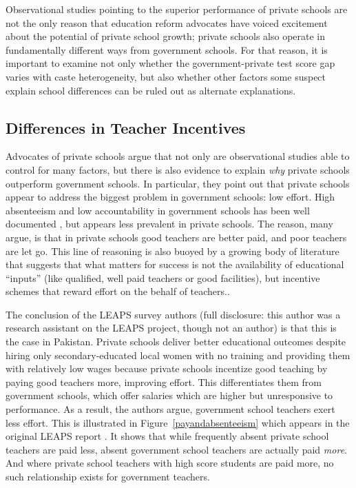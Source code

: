 \documentclass[Eubank_pk_ethnic_sorting.tex]{subfiles}
\begin{document}
Observational studies pointing to the superior performance of private schools are not the only reason that education reform advocates have voiced excitement about the potential of private school growth; private schools also operate in fundamentally different ways from government schools. For that reason, it is important to examine not only whether the government-private test score gap varies with caste heterogeneity, but also whether other factors some suspect explain school differences can be ruled out as alternate explanations. 


\subsection{Differences in Teacher Incentives}\label{}

Advocates of private schools argue that not only are observational studies able to control for many factors, but there is also evidence to explain \emph{why} private schools outperform government schools. In particular, they point out that private schools appear to address the biggest problem in government schools: low effort. High absenteeism and low accountability in government schools has been well documented \citep{Muralidharan:2008tb, Chaudhury:2006vp}, but appears less prevalent in private schools. The reason, many argue, is that in private schools good teachers are better paid, and poor teachers are let go. This line of reasoning is also buoyed by a growing body of literature that suggests that what matters for success is not the availability of educational ``inputs'' (like qualified, well paid teachers or good facilities), but incentive schemes that reward effort on the behalf of teachers.\citep{Hanushek:1997tt,Hanushek:2003hz,Banerjee:2007wx}.

The conclusion of the LEAPS survey authors (full disclosure: this author was a research assistant on the LEAPS project, though not an author) is that this is the case in Pakistan. Private schools deliver better educational outcomes despite hiring only secondary-educated local women with no training and providing them with relatively low wages because private schools incentize good teaching by paying good teachers more, improving effort. This differentiates them from government schools, which offer salaries which are higher but unresponsive to performance. As a result, the authors argue, government school teachers exert less effort. This is illustrated in Figure~\ref{payandabsenteeism} which appears in the original LEAPS report \citep{Andrabi:2007we}. It shows that while frequently absent private school teachers are paid less, absent government school teachers are actually paid \emph{more}. And where private school teachers with high score students are paid more, no such relationship exists for government teachers.
\end{document}
